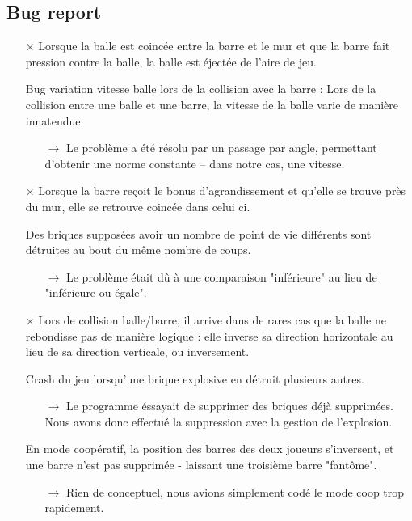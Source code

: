   \subsection{Bug report}
    \begin{enumerate}
       \item[\bf $\times$] Lorsque la balle est coincée entre la barre et le mur et que la barre fait pression contre la balle, la balle est éjectée de l'aire de jeu.

      \item[\checkmark] Bug variation vitesse balle lors de la collision avec la barre : Lors de la collision entre une balle et une barre, la vitesse de la balle varie de manière innatendue.
        \begin{itemize}
            \item[$\rightarrow$] Le problème a été résolu par un passage par angle, permettant d'obtenir une norme constante -- dans notre cas, une vitesse.
        \end{itemize}

      \item[\bf $\times$] Lorsque la barre reçoit le bonus d'agrandissement et qu'elle se trouve près du mur, elle se retrouve coincée dans celui ci.

      \item[\checkmark] Des briques supposées avoir un nombre de point de vie différents sont détruites au bout du même nombre de coups.
        \begin{itemize}
            \item[$\rightarrow$] Le problème était dû à une comparaison "inférieure" au lieu de "inférieure ou égale".
        \end{itemize}

      \item[\bf $\times$] Lors de collision balle/barre, il arrive dans de rares cas que la balle ne rebondisse pas de manière logique : elle inverse sa direction horizontale au lieu de sa direction verticale, ou inversement. 
      \item[\checkmark] Crash du jeu lorsqu'une brique explosive en détruit plusieurs autres.
        \begin{itemize}
            \item[$\rightarrow$] Le programme éssayait de supprimer des briques déjà supprimées. Nous avons donc effectué la suppression avec la gestion de l'explosion.
        \end{itemize}
      \item[\checkmark] En mode coopératif, la position des barres des deux joueurs s'inversent, et une barre n'est pas supprimée - laissant une troisième barre "fantôme".
      \begin{itemize}
        \item[$\rightarrow$] Rien de conceptuel, nous avions simplement codé le mode coop trop rapidement.
      \end{itemize}


\end{enumerate}
